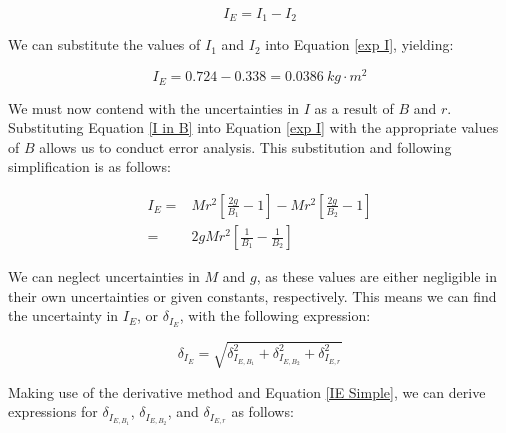 \documentclass[12pt]{article}
\begin{document}
\begin{equation}
    I_E = I_1-I_2 \label{exp I}
\end{equation}

We can substitute the values of $I_1$ and $I_2$ into Equation \ref{exp I}, yielding:

\begin{equation*}
    I_E=0.724-0.338=0.0386\ kg\cdot m^2
\end{equation*}

\indent We must now contend with the uncertainties in $I$ as a result of $B$ and $r$. Substituting Equation \ref{I in B} into Equation \ref{exp I} with the appropriate values of $B$ allows us to conduct error analysis. This substitution and following simplification is as follows: 

\begin{equation}
    \begin{split}
        I_E=&Mr^2[\frac{2g}{B_1}-1] - Mr^2[\frac{2g}{B_2}-1] \\ 
        =& 2gMr^2[\frac{1}{B_1}-\frac{1}{B_2}] \label{IE Simple}
    \end{split}
\end{equation}

\indent We can neglect uncertainties in $M$ and $g$, as these values are either negligible in their own uncertainties or given constants, respectively. This means we can find the uncertainty in $I_E$, or $\delta_{I_E}$, with the following expression:

\begin{equation}
    \delta_{I_E}=\sqrt{\delta^2_{I_{E,B_1}}+\delta^2_{I_{E,B_2}}+\delta^2_{I_{E,r}}} \label{UNC in IE}
\end{equation}

\indent Making use of the derivative method and Equation \ref{IE Simple}, we can derive expressions for $\delta_{I_{E,B_1}}$, $\delta_{I_{E,B_2}}$, and $\delta_{I_{E,r}}$ as follows:
\end{document}
